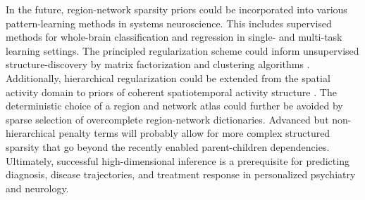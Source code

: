 \documentclass{article}
\begin{document}
In the future,
region-network sparsity priors could be incorporated into various
pattern-learning methods in systems neuroscience.
%
This includes supervised methods for whole-brain classification and regression
in single- and multi-task learning settings.
The principled regularization scheme could inform
unsupervised structure-discovery by
matrix factorization and clustering algorithms
\cite{jenatton2009structured, witten2010framework}.
Additionally,
hierarchical regularization could be extended
from the spatial activity domain to
priors of coherent spatiotemporal activity structure
\cite{gramfort2011tracking}.
%
The deterministic choice of a region and network atlas
could further be avoided by
sparse selection of overcomplete region-network dictionaries.
Advanced but non-hierarchical penalty terms will probably allow for
more complex structured sparsity that
go beyond the recently enabled parent-children dependencies.
%
Ultimately,
successful high-dimensional inference is
a prerequisite
for predicting diagnosis,
disease trajectories, and treatment response
in personalized psychiatry and neurology.




  
\small
% 


% 
\end{document}
